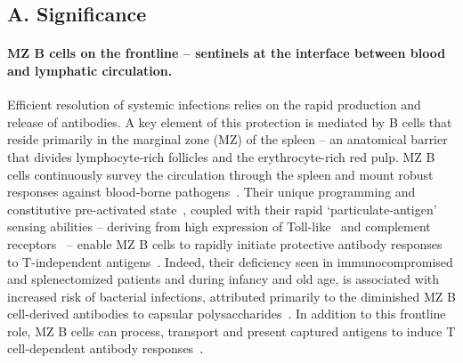 \documentclass[11pt]{article}
\newcommand{\para}[1]{\vspace*{-4.5mm}\paragraph{#1}}
\begin{document}
\pagestyle{empty}

\setlength{\parskip}{1.5mm}





\subsection*{A. Significance}
\vspace{0.4cm}
\para{MZ B cells on the frontline -- sentinels at the interface between blood and lymphatic circulation.}
Efficient resolution of systemic infections relies on the rapid production and release of antibodies. 
A key element of this protection is mediated by B cells that reside primarily in the marginal zone (MZ) of the spleen -- an anatomical barrier that divides  lymphocyte-rich follicles and the erythrocyte-rich red pulp. 
MZ B cells continuously survey the  circulation through the spleen and mount robust responses against blood-borne pathogens~\cite{Kumararatne_1981, Kraal_1992, Schmidt_1993, Martin_2001, Zandvoort_2002}. 
Their unique programming and constitutive pre-activated state~\cite{Oliver_1997, Martin_2002, Cerutti_2013}, coupled with their rapid `particulate-antigen' sensing abilities  -- deriving from high expression of Toll-like~\cite{Rubtsov_2008, Bialecki_2009} and complement receptors~\cite{Gray_1984, Dempsey_1996} -- enable MZ B cells to rapidly initiate protective antibody responses to T-independent antigens~\cite{Guinamard_2000, Martin_2001, Martin_Kearney_2000, Balazs_2002, Won_2002, Zandvoort_2002}.
Indeed, their deficiency seen in immunocompromised and  splenectomized patients and during infancy and old age, is associated with increased risk of bacterial infections, attributed primarily to the diminished MZ B cell-derived antibodies to capsular polysaccharides~\cite{Amlot_1985, Brigden_1999, Guinamard_2000,  Castagnola_2003, Kruetzmann_2003, Kruschinski_2004, Sagaert_2007, Carsetti_2005, Weller_2012}.
In addition to this frontline role, MZ B cells can process, transport and present captured antigens to induce T cell-dependent antibody responses~\cite{Oliver_1999, Attanavanich_2004,  Cinamon_2007, Song_2003, Chappell_2012}. %
\end{document}
